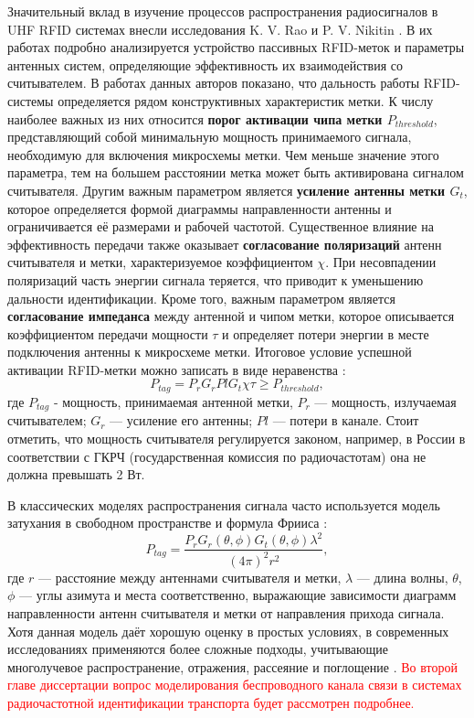 \documentclass[12pt]{article}
\theoremstyle{definition}
\begin{document}
Значительный вклад в изучение процессов распространения радиосигналов в UHF RFID системах внесли исследования K. V. Rao и P. V. Nikitin \cite{Nikitin2006, Nikitin2006b, Nikitin2008}. В их работах подробно анализируется устройство пассивных RFID-меток и параметры антенных систем, определяющие эффективность их взаимодействия со считывателем. В работах данных авторов показано, что дальность работы RFID-системы определяется рядом конструктивных характеристик метки. К числу наиболее важных из них относится \textbf{порог активации чипа метки \(P_{threshold}\)}, представляющий собой минимальную мощность принимаемого сигнала, необходимую для включения микросхемы метки. Чем меньше значение этого параметра, тем на большем расстоянии метка может быть активирована сигналом считывателя. Другим важным параметром является \textbf{усиление антенны метки \(G_t\)}, которое определяется формой диаграммы направленности антенны и ограничивается её размерами и рабочей частотой. Существенное влияние на эффективность передачи также оказывает \textbf{согласование поляризаций} антенн считывателя и метки, характеризуемое коэффициентом \textbf{\(\chi\)}. При несовпадении поляризаций часть энергии сигнала теряется, что приводит к уменьшению дальности идентификации. Кроме того, важным параметром является \textbf{согласование импеданса} между антенной и чипом метки, которое описывается коэффициентом передачи мощности \textbf{\(\tau\)} и определяет потери энергии в месте подключения антенны к микросхеме метки. Итоговое условие успешной активации RFID-метки можно записать в виде неравенства \cite{Rao2008}:
\begin{equation}\label{eq:power}
    P_{tag} = P_rG_rPlG_t\chi\tau\geq P_{threshold},
\end{equation}
где \(P_{tag}\) - мощность, принимаемая антенной метки, \(P_r\) — мощность, излучаемая считывателем; \(G_r\) — усиление его антенны; \(Pl\) — потери в канале. Стоит отметить, что мощность считывателя регулируется законом, например, в России в соответствии с ГКРЧ (государственная комиссия по радиочастотам) она не должна превышать 2 Вт.

В классических моделях распространения сигнала часто используется модель затухания в свободном пространстве и формула Фрииса \cite{Marrocco}:
\begin{equation}\label{eq:friis}
    P_{tag}=\frac{P_rG_r(\theta,\phi)G_t(\theta,\phi)\lambda^2}{(4\pi)^2r^2},
\end{equation}
где \(r\) — расстояние между антеннами считывателя и метки, \(\lambda\) — длина волны, \(\theta\), \(\phi\) — углы азимута и места соответственно, выражающие зависимости диаграмм направленности антенн считывателя и метки от направления прихода сигнала. Хотя данная модель даёт хорошую оценку в простых условиях, в современных исследованиях применяются более сложные подходы, учитывающие многолучевое распространение, отражения, рассеяние и поглощение \cite{Alhassoun2019}. \textcolor{red}{Во второй главе диссертации вопрос моделирования беспроводного канала связи в системах радиочастотной идентификации транспорта будет рассмотрен подробнее.}
\end{document}
